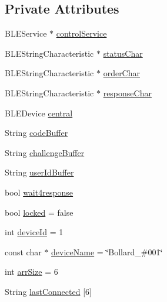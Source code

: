 \subsection*{Private Attributes}
\begin{DoxyCompactItemize}
\item 
B\+L\+E\+Service $\ast$ \mbox{\hyperlink{class_bollard_controller_class_aa33c6977997f53ec8665ac97978e8658}{control\+Service}}
\item 
B\+L\+E\+String\+Characteristic $\ast$ \mbox{\hyperlink{class_bollard_controller_class_a3c635fd63b84f3653154dc9e7ce96680}{status\+Char}}
\item 
B\+L\+E\+String\+Characteristic $\ast$ \mbox{\hyperlink{class_bollard_controller_class_a2bddc09b3a29a30f38c2ce820a750a0f}{order\+Char}}
\item 
B\+L\+E\+String\+Characteristic $\ast$ \mbox{\hyperlink{class_bollard_controller_class_aa83ef5e8c78a02cab745be0e8e5245fd}{response\+Char}}
\item 
B\+L\+E\+Device \mbox{\hyperlink{class_bollard_controller_class_a20bc21b9a4101f873d334f2509896c86}{central}}
\item 
String \mbox{\hyperlink{class_bollard_controller_class_a3a87ae7d8b4193850cba8f81e6d00fad}{code\+Buffer}}
\item 
String \mbox{\hyperlink{class_bollard_controller_class_a96ffd2a4993d585c4e792b9fc4a08d11}{challenge\+Buffer}}
\item 
String \mbox{\hyperlink{class_bollard_controller_class_af336aee4d67527cf9ddb398ef77caec6}{user\+Id\+Buffer}}
\item 
bool \mbox{\hyperlink{class_bollard_controller_class_a8381678e8f8a4cbf15c72fb6e03d534d}{wait4response}}
\item 
bool \mbox{\hyperlink{class_bollard_controller_class_ac4ce4bd9274bd1199af144139af0cce5}{locked}} = false
\item 
int \mbox{\hyperlink{class_bollard_controller_class_a2ee4843a75dc2efa26044c0b80c669e2}{device\+Id}} = 1
\item 
const char $\ast$ \mbox{\hyperlink{class_bollard_controller_class_a957641f4012a1089512b61792d661fb6}{device\+Name}} = \char`\"{}Bollard\+\_\+\#001\char`\"{}
\item 
int \mbox{\hyperlink{class_bollard_controller_class_afafc24c575b1cc0519f196097a1999dc}{arr\+Size}} = 6
\item 
String \mbox{\hyperlink{class_bollard_controller_class_aaa6b8839cf845f53212c5cc80c068737}{last\+Connected}} \mbox{[}6\mbox{]}
\item 

\end{DoxyCompactItemize}
